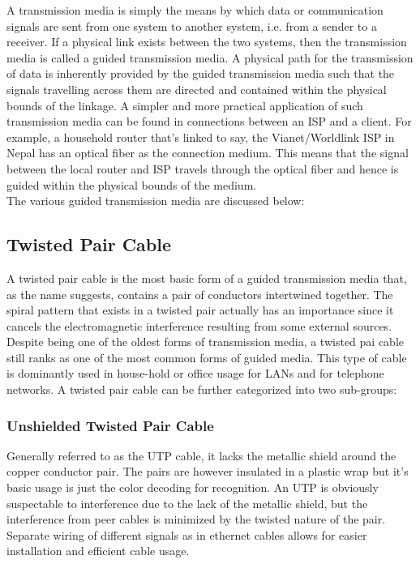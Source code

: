 \documentclass{home_assignment}
\begin{document}
A transmission media is simply the means by which data or communication signals are sent from one system to another system, i.e.  from a sender to a receiver.  If a physical link exists between the two systems, then the transmission media is called a guided transmission media. A physical path for the transmission of data is inherently provided by the guided transmission media such that the signals travelling across them are directed and contained within the physical bounds of the linkage. A simpler and more practical application of such transmission media can be found in connections between an ISP and a client. For example, a household router that’s linked to say, the Vianet/Worldlink ISP in Nepal has an optical fiber as the connection medium. This means that the signal between the local router and ISP travels through the optical fiber and hence is guided within the physical bounds of the medium.
\\The various guided transmission media are discussed below:
\subsection*{Twisted Pair Cable}
A twisted pair cable is the most basic form of a guided transmission media that, as the name suggests, contains a pair of conductors intertwined together. The spiral pattern that exists in a twisted pair actually has an importance since it cancels the electromagnetic interference resulting from some external sources. Despite being one of the oldest forms of transmission media, a twisted pai cable still ranks as one of the most common forms of guided media. This type of cable is dominantly used in house-hold or office usage for LANs and for telephone networks. A twisted pair cable can be further categorized into two sub-groups:
\subsubsection*{Unshielded Twisted Pair Cable}
Generally referred to as the UTP cable, it lacks the metallic shield around the copper conductor pair. The pairs are however insulated in a plastic wrap but it’s basic usage is just the color decoding for recognition. An UTP is obviously suspectable to interference due to the lack of the metallic shield, but the interference from peer cables is minimized by the twisted nature of the pair. Separate wiring of different signals as in ethernet cables allows for easier installation and efficient cable usage.
\end{document}

